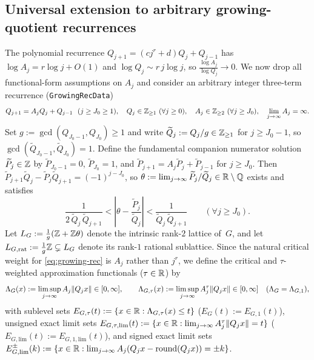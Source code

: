 \subsection{Universal extension to arbitrary growing-quotient recurrences}\label{sec:growing-rec}

The polynomial recurrence $Q_{j+1}=(cj^r+d)Q_j+Q_{j-1}$ has $\log A_j=r\log j+O(1)$
and $\log Q_j\sim r\,j\log j$, so $\frac{\log A_j}{\log Q_j}\to 0$. We now drop
all functional-form assumptions on $A_j$ and consider an arbitrary integer
three-term recurrence (\texttt{GrowingRecData})
\begin{equation}\label{eq:growing-rec}
Q_{j+1}=A_j Q_j+Q_{j-1}\ \ (j\ge J_0\ge 1),\quad Q_j\in\Z_{\ge1}\ (\forall j\ge0),
\quad A_j\in\Z_{\ge2}\ (\forall j\ge J_0),\quad \lim_{j\to\infty}A_j=\infty.
\end{equation}
Set $g:=\gcd(Q_{J_0-1},Q_{J_0})\ge1$ and write $\widetilde Q_j:=Q_j/g\in\mathbb{Z}_{\ge1}$
for $j\ge J_0-1$, so $\gcd(\widetilde Q_{J_0-1},\widetilde Q_{J_0})=1$. Define the
fundamental companion numerator solution $\widetilde P_j\in\mathbb{Z}$ by
$\widetilde P_{J_0-1}=0$, $\widetilde P_{J_0}=1$, and
$\widetilde P_{j+1}=A_j\widetilde P_j+\widetilde P_{j-1}$ for $j\ge J_0$. Then
$\widetilde P_{j+1}\widetilde Q_j-\widetilde P_j\widetilde Q_{j+1}=(-1)^{j-J_0}$,
so $\theta:=\lim_{j\to\infty}\widetilde P_j/\widetilde Q_j\in\mathbb{R}\setminus\mathbb{Q}$ exists
and satisfies
\begin{equation}\label{eq:growing-theta-error}
\frac{1}{2\,\widetilde Q_j\,\widetilde Q_{j+1}}
<\left|\theta-\frac{\widetilde P_j}{\widetilde Q_j}\right|
<\frac{1}{\widetilde Q_j\,\widetilde Q_{j+1}}
\qquad(\forall j\ge J_0).
\end{equation}
Let $L_G:=\frac{1}{g}(\mathbb{Z}+\mathbb{Z}\theta)$ denote the intrinsic rank-$2$ lattice of~$G$,
and let $L_{G,\mathrm{rat}}:=\frac{1}{g}\mathbb{Z}\subsetneq L_G$ denote its rank-$1$
rational sublattice. Since the natural critical weight for \eqref{eq:growing-rec}
is $A_j$ rather than $j^r$, we define the critical and $\tau$-weighted
approximation functionals ($\tau\in\mathbb{R}$) by
\[
\Lambda_G(x):=\limsup_{j\to\infty} A_j\|Q_j x\|\in[0,\infty],\qquad
\Lambda_{G,\tau}(x):=\limsup_{j\to\infty} A_j^\tau\|Q_j x\|\in[0,\infty]\quad(\Lambda_G=\Lambda_{G,1}),
\]
with sublevel sets $E_{G,\tau}(t):=\{x\in\mathbb{R}:\Lambda_{G,\tau}(x)\le t\}$ ($E_G(t):=E_{G,1}(t)$),
unsigned exact limit sets $E_{G,\tau,\mathrm{lim}}(t):=\{x\in\mathbb{R}:\lim_{j\to\infty}A_j^\tau\|Q_j x\|=t\}$
($E_{G,\mathrm{lim}}(t):=E_{G,1,\mathrm{lim}}(t)$), and signed exact limit sets
$E_{G,\mathrm{lim}}^\pm(k):=\{x\in\mathbb{R}:\lim_{j\to\infty}A_j(Q_j x-\mathrm{round}(Q_j x))=\pm k\}$.

